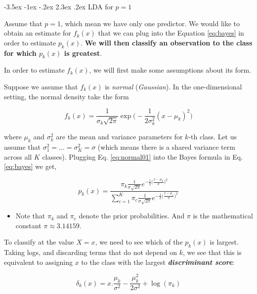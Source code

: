 \documentclass[]{book}
\makeatletter
\newenvironment{rmdblock}[1]
  {\begin{shaded*}
  \begin{itemize}
  \renewcommand{\labelitemi}{
    \raisebox{-.7\height}[0pt][0pt]{
      {\setkeys{Gin}{width=2em,keepaspectratio}\texttt{[image: img/icons/\#1]}}
    }
  }
  \item
  }
  {
  \end{itemize}
  \end{shaded*}
  }
\newenvironment{rmdcaution}
  {\begin{rmdblock}{caution}}
  {\end{rmdblock}}
\renewcommand\section{\@startsection {section}{1}{\z@}%
                                   {-3.5ex \@plus -1ex \@minus -.2ex}%
                                   {2.3ex \@plus.2ex}%
                                   {\normalfont\Large\bfseries\color{ForestGreen}}}
\theoremstyle{definition}
\theoremstyle{definition}
\theoremstyle{definition}
\theoremstyle{remark}
\makeatother
\begin{document}
\section{\texorpdfstring{LDA for
\(p=1\)}{LDA for p=1}}\label{lda-for-p1}

Assume that \(p=1\), which mean we have only one predictor. We would
like to obtain an estimate for \(f_k(x)\) that we can plug into the
Equation \eqref{eq:bayes} in order to estimate \(p_k(x)\). \textbf{We will
then classify an observation to the class for which \(p_k(x)\) is
greatest}.

In order to estimate \(f_k(x)\), we will first make some assumptions
about its form.

Suppose we assume that \(f_k(x)\) is \emph{normal} (\emph{Gaussian}). In
the one-dimensional setting, the normal density take the form

\begin{equation}
f_k(x)= \frac{1}{\sigma_k\sqrt{2\pi}} \exp \big( - \frac{1}{2\sigma_k^2 } (x-\mu_k)^2\big)
\label{eq:normal01}
\end{equation}

where \(\mu_k\) and \(\sigma_k^2\) are the mean and variance parameters
for \(k\)-th class. Let us assume that
\(\sigma_1^2 = \ldots = \sigma_K^2 = \sigma\) (which means there is a
shared variance term across all \(K\) classes). Plugging Eq.
\eqref{eq:normal01} into the Bayes formula in Eq. \eqref{eq:bayes} we get,

\begin{equation}
p_k(x) = \frac{  \pi_k \frac{1}{\sigma \sqrt{2\pi}} e^{-\frac{1}{2} \big(\frac{x-\mu_k}{\sigma}\big)^2 } }{  \sum_{c=1}^K  \pi_c \frac{1}{\sigma \sqrt{2\pi}} e^{-\frac{1}{2} \big(\frac{x-\mu_c}{\sigma}\big)^2 } }
\label{eq:pkx}
\end{equation}

\begin{rmdcaution}
Note that \(\pi_k\) and \(\pi_c\) denote the prior probabilities. And
\(\pi\) is the mathematical constant \(\pi \approx 3.14159\).
\end{rmdcaution}

To classify at the value \(X = x\), we need to see which of the
\(p_k(x)\) is largest. Taking logs, and discarding terms that do not
depend on \(k\), we see that this is equivalent to assigning \(x\) to
the class with the largest \textbf{\emph{discriminant score}}:

\begin{equation}
\delta_k(x) = x.\frac{\mu_k}{\sigma^2} - \frac{\mu_k^2}{2\sigma^2} + \log (\pi_k)
\label{eq:discscore}
\end{equation}
\end{document}
